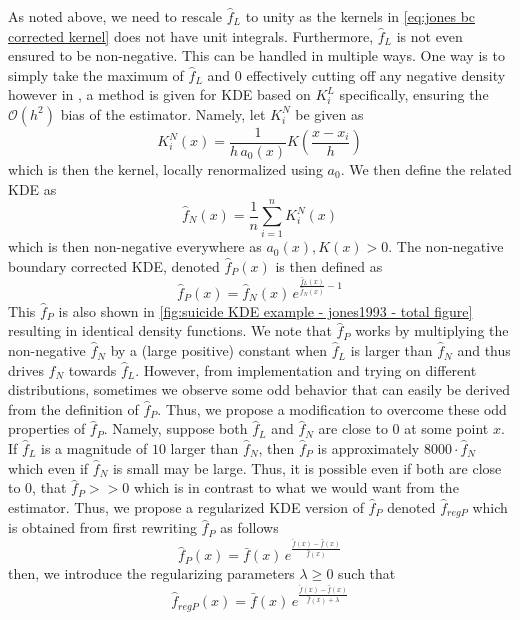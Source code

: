 \documentclass[../Thesis.tex]{subfiles}
\begin{document}
As noted above, we need to rescale $\hat{f}_L$ to unity as the kernels in \autoref{eq:jones bc corrected kernel} does not have unit integrals. Furthermore, $\hat{f}_L$ is not even ensured to be non-negative. This can be handled in multiple ways. One way is to simply take the maximum of $\hat{f}_L$ and $0$ effectively cutting off any negative density however in \cite{A-simple-nonnegative-boundary-correction-method-for-kernel-density-estimation}, a method is given for KDE based on $K_i^L$ specifically, ensuring the $\mathcal{O}\left(h^2\right)$ bias of the estimator. Namely, let $K^N_i$ be given as
$$K^N_i \left(x\right) = \frac{1}{h\,a_0\left(x\right)} K\left(\frac{x-x_i}{h}\right)$$
which is then the kernel, locally renormalized using $a_0$. We then define the related KDE as
$$\hat{f}_N \left(x\right) = \frac{1}{n} \sum_{i = 1}^{n} K_i^N \left(x\right)$$
which is then non-negative everywhere as $a_0\left(x\right), K\left(x\right) > 0$. The non-negative boundary corrected KDE, denoted $\hat{f}_P \left(x\right)$ is then defined as
$$\hat{f}_P \left(x\right) =\hat{f}_N \left(x\right) \, e ^{\frac{\hat{f}_L \left(x\right)}{\hat{f}_N \left(x\right)} - 1} $$
This $\hat{f}_P$ is also shown in \autoref{fig:suicide KDE example - jones1993 - total figure} resulting in identical density functions. We note that $\hat{f}_P$ works by multiplying the non-negative $\hat{f}_N$ by a (large positive) constant when $\hat{f}_L$ is larger than $\hat{f}_N$ and thus drives $\hat{f}_N$ towards $\hat{f}_L$. However, from implementation and trying on different distributions, sometimes we observe some odd behavior that can easily be derived from the definition of $\hat{f}_P$. Thus, we propose a modification to overcome these odd properties of $\hat{f}_P$. Namely, suppose both $\hat{f}_L$ and $\hat{f}_N$ are close to $0$ at some point $x$. If $\hat{f}_L$ is a magnitude of $10$ larger than $\hat{f}_N$, then $\hat{f}_P$ is approximately $8000 \cdot \hat{f}_N$ which even if $\hat{f}_N$ is small may be large. Thus, it is possible even if both  are close to $0$, that $\hat{f}_P >> 0$ which is in contrast to what we would want from the estimator. Thus, we propose a regularized KDE version of $\hat{f}_P$ denoted $\hat{f}_{regP}$ which is obtained from first rewriting $\hat{f}_P$ as follows
$$\hat{f}_P\left(x\right) = \bar{f}\left(x\right) \, e^{\frac{\tilde{f}\left(x\right) - \hat{f}\left(x\right)}{\hat{f}\left(x\right)} }$$
then, we introduce the regularizing parameters $\lambda \geq 0$ such that
$$\hat{f}_{regP}\left(x\right) = \bar{f}\left(x\right) \, e^{\frac{\tilde{f}\left(x\right) - \hat{f}\left(x\right)}{\hat{f}\left(x\right) + \lambda} }$$
\end{document}
